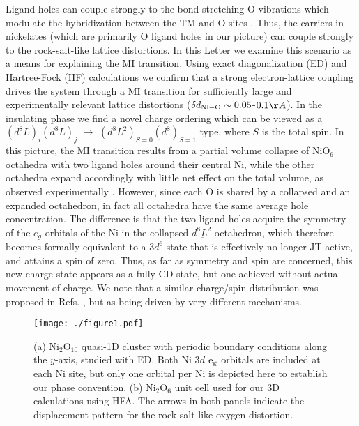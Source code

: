 \documentclass[showpacs,preprintnumbers,amsmath,amssymb,prl,aps,twocolumn,superscriptaddress]{revtex4}
\newcommand{\ligand}{{\underbar L}}
\begin{document}
Ligand holes can couple strongly to the bond-stretching O
vibrations which modulate the hybridization between the 
TM and  O sites
\cite{MedardeIsotope,Gunnarsson}. Thus, the carriers  in
 nickelates (which are primarily O ligand holes in our picture)  
can couple strongly to the rock-salt-like lattice distortions. In this
Letter we examine this  
scenario as a means for explaining the MI transition. 
Using exact diagonalization (ED) and Hartree-Fock  (HF)
calculations \cite{Chen, MeanField} we   
confirm that a strong electron-lattice coupling drives the system 
through a MI transition for sufficiently large and experimentally 
relevant lattice distortions 
($\delta d_{\rm Ni-O} \sim 0.05$-$0.1\AA$). In the insulating phase 
we find a novel charge ordering 
which can be viewed as a $(d^8\ligand)_i(d^8\ligand)_j$ $\rightarrow$  
$(d^8\ligand^2)_{S=0}(d^8)_{S=1}$ type, where $S$ is the total spin.  
In this picture, the MI transition results from a
partial volume collapse of NiO$_6$ octahedra with two ligand holes 
around their central Ni, while the other octahedra
expand accordingly with little net effect on the total volume,
as observed experimentally \cite{Review}. However, since each O is shared by a
collapsed and an expanded octahedron, in fact all octahedra
have the same average hole
concentration. The difference is that the two ligand
holes acquire the symmetry of the $e_g$ orbitals of the Ni in the
collapsed $d^8\ligand^2$ octahedron, which therefore becomes
formally equivalent to a 3$d^6$ state that is effectively no longer 
JT active, and attains a spin of zero.    
Thus, as far as symmetry and spin are concerned, this new charge state
appears as a fully CD state, but one 
achieved without actual movement of charge.
We note that a similar charge/spin distribution was proposed 
in Refs. , but as being driven by very
different mechanisms.

\begin{figure}
 \texttt{[image: ./figure1.pdf]}
 \caption{\label{Fig:clusters}  
  (a) 
 Ni$_2$O$_{10}$ quasi-1D cluster with periodic boundary conditions
 along the $y$-axis, studied with ED. Both Ni 3$d$ ${\rm e}_{\rm g}$
 orbitals are included at each Ni site, but only one orbital per Ni is
 depicted here to establish our phase convention. (b)
 Ni$_2$O$_6$ unit cell used for our  3D calculations using HFA.
 The arrows in both panels indicate the displacement pattern for the
 rock-salt-like oxygen distortion.
 }
\end{figure}
\end{document}
